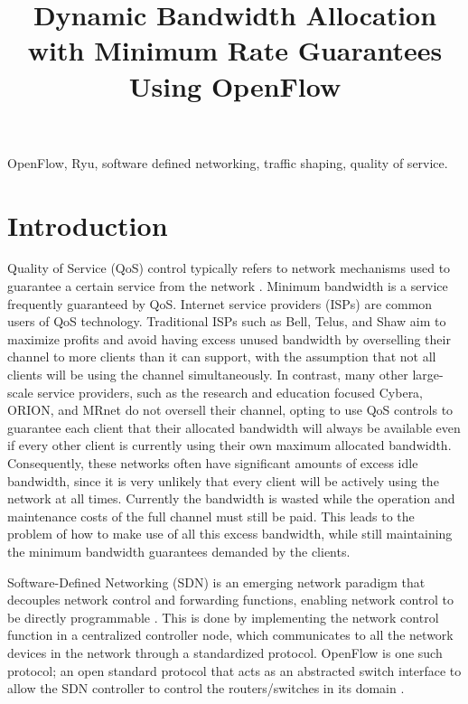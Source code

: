 \documentclass[accepted,single]{gipaper}
\title{Dynamic Bandwidth Allocation with Minimum Rate Guarantees Using OpenFlow}
\affiliation{
    Department of Computer Science \\
    University of Calgary
}
\begin{document}
\begin{keywords}
OpenFlow, Ryu, software defined networking, traffic shaping, quality of service.
\end{keywords}

\section{Introduction}
\label{intro}

Quality of Service (QoS) control typically refers to network mechanisms used to guarantee a certain service from the network \cite{Krishna:2016}. Minimum bandwidth is a service frequently guaranteed by QoS. Internet service providers (ISPs) are common users of QoS technology. Traditional ISPs such as Bell, Telus, and Shaw aim to maximize profits and avoid having excess unused bandwidth by overselling their channel to more clients than it can support, with the assumption that not all clients will be using the channel simultaneously. In contrast, many other large-scale service providers, such as the research and education focused Cybera, ORION, and MRnet do not oversell their channel, opting to use QoS controls to guarantee each client that their allocated bandwidth will always be available even if every other client is currently using their own maximum allocated bandwidth. Consequently, these networks often have significant amounts of excess idle bandwidth, since it is very unlikely that every client will be actively using the network at all times. Currently the bandwidth is wasted while the operation and maintenance costs of the full channel must still be paid. This leads to the problem of how to make use of all this excess bandwidth, while still maintaining the minimum bandwidth guarantees demanded by the clients.

Software-Defined Networking (SDN) is an emerging network paradigm that decouples network control and forwarding functions, enabling network control to be directly programmable \cite{opennetworking}. This is done by implementing the network control function in a centralized controller node, which communicates to all the network devices in the network through a standardized protocol. OpenFlow is one such protocol; an open standard protocol that acts as an abstracted switch interface to allow the SDN controller to control the routers/switches in its domain \cite{sdx}.
\end{document}
